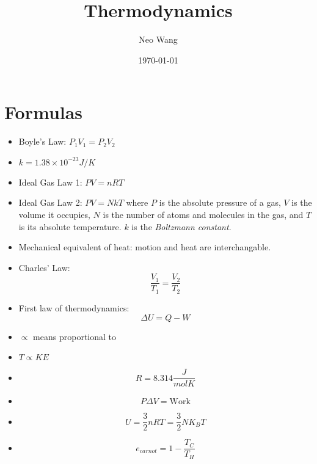 \documentclass{article}
\title{Thermodynamics}
\author{Neo Wang}
\date{\today}
\begin{document}
\maketitle

\section{Formulas}

\begin{itemize}
    \item Boyle's Law: $P_1V_1=P_2V_2$
    \item $k=1.38\times 10^{-23}J/K$
    \item Ideal Gas Law 1: $PV=nRT$
    \item Ideal Gas Law 2: $PV=NkT$ where $P$ is the absolute pressure of a gas, $V$ is the volume it occupies, $N$ is the number of atoms and molecules in the gas, and $T$ is its absolute temperature. $k$ is the \textit{Boltzmann constant}.
    \item Mechanical equivalent of heat: motion and heat are interchangable.
    \item Charles' Law: $$\frac{V_1}{T_1}=\frac{V_2}{T_2}$$
    \item First law of thermodynamics: $$\Delta U = Q - W$$
    \item $\propto$ means proportional to
    \item $T\propto KE$
    \item $$R=8.314\frac{J}{molK}$$
    \item $$P\Delta V=\textrm{Work}$$
    \item $$U = \frac{3}{2}nRT=\frac{3}{2}NK_BT$$
    \item $$e_{carnot} = 1 - \frac{T_C}{T_H}$$
\end{itemize}
\end{document}
